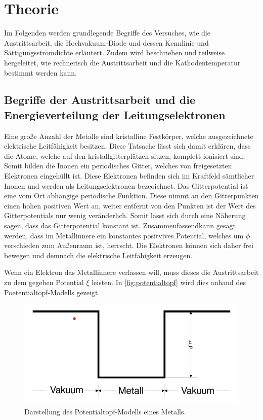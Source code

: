 \section{Theorie}
\label{sec:theorie}

Im Folgenden werden grundlegende Begriffe des Versuches, wie die Austrittsarbeit, die Hochvakuum-Diode und dessen Kennlinie und Sättigungsstromdichte erläutert.
Zudem wird beschrieben und teilweise hergeleitet, wie rechnerisch die Austrittsarbeit und die Kathodentemperatur bestimmt werden kann.

\subsection{Begriffe der Austrittsarbeit und die Energieverteilung der Leitungselektronen}
\label{sec:Begriffe der Austrittsarbeit und die Energieverteilung der Leitungselektronen}

Eine große Anzahl der Metalle sind kristalline Festkörper, welche ausgezeichnete elektrische Leitfähigkeit besitzen.
Diese Tatsache lässt sich damit erklären, dass die Atome, welche auf den kristallgitterplätzen sitzen, komplett ionisiert sind.
Somit bilden die Inonen ein periodisches Gitter, welches von freigesetzten Elektronen eingehüllt ist.
Diese Elektronen befinden sich im Kraftfeld sämtlicher Inonen und werden als Leitungselektronen bezeoichnet.
Das Gitterpotential ist eine vom Ort abhängige periodische Funktion. Diese nimmt an den Gitterpunkten einen hohen positiven Wert an, weiter 
entfernt von den Punkten ist der Wert des Gitterpotentials nur wenig veränderlich. Somit lässt sich durch eine
Näherung sagen, dass das Gitterpotential konstant ist. Zusammenfassendkann gesagt werden, dass im Metallinnere ein konstantes 
positvives Potential, welches um $\phi$ verschieden zum Außenraum ist, herrscht. Die Elektronen können sich daher 
frei bewegen und demnach die elektrische Leitfähigkeit erzeugen.

Wenn ein Elektron das Metallinnere verlassen will, muss dieses die Austrittsarbeit zu dem gegeben Potential $\xi$ leisten.
In \autoref{fig:potentialtopf} wird dies anhand des Poetentialtopf-Modells gezeigt.
\begin{figure}[H]
    \centering
    \includegraphics[width=0.5\linewidth]{content/grafik/potential.png}
    \caption{Darstellung des Potentialtopf-Modells eines Metalls.\cite{elektron}}
    \label{fig:potentialtopf}
\end{figure}

